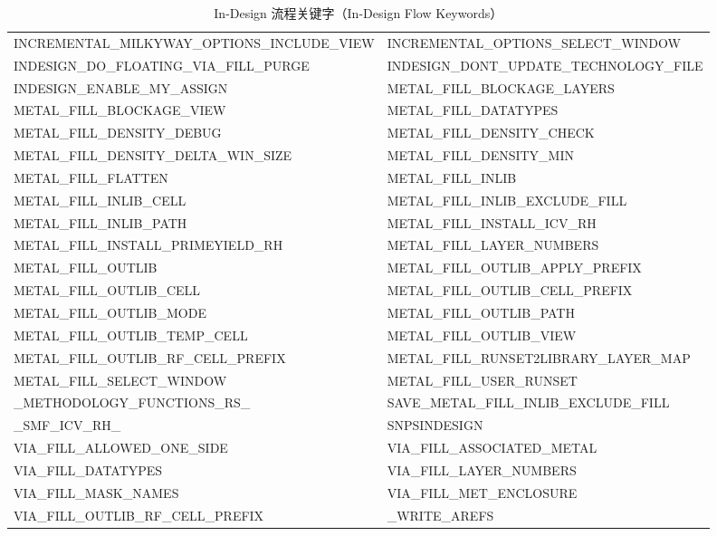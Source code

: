 \begin{longtable}{@{}>{\raggedright\arraybackslash\ttfamily}p{} >{\raggedright\arraybackslash\ttfamily}p{}@{}}
\caption{In-Design 流程关键字（In-Design Flow Keywords）}\label{tab:pxl-indesign-kw}\\
\toprule
\endfirsthead
\endhead
\bottomrule
\endfoot
INCREMENTAL\_MILKYWAY\_OPTIONS\_INCLUDE\_VIEW & INCREMENTAL\_OPTIONS\_SELECT\_WINDOW \\
INDESIGN\_DO\_FLOATING\_VIA\_FILL\_PURGE & INDESIGN\_DONT\_UPDATE\_TECHNOLOGY\_FILE \\
INDESIGN\_ENABLE\_MY\_ASSIGN & METAL\_FILL\_BLOCKAGE\_LAYERS \\
METAL\_FILL\_BLOCKAGE\_VIEW & METAL\_FILL\_DATATYPES \\
METAL\_FILL\_DENSITY\_DEBUG & METAL\_FILL\_DENSITY\_CHECK \\
METAL\_FILL\_DENSITY\_DELTA\_WIN\_SIZE & METAL\_FILL\_DENSITY\_MIN \\
METAL\_FILL\_FLATTEN & METAL\_FILL\_INLIB \\
METAL\_FILL\_INLIB\_CELL & METAL\_FILL\_INLIB\_EXCLUDE\_FILL \\
METAL\_FILL\_INLIB\_PATH & METAL\_FILL\_INSTALL\_ICV\_RH \\
METAL\_FILL\_INSTALL\_PRIMEYIELD\_RH & METAL\_FILL\_LAYER\_NUMBERS \\
METAL\_FILL\_OUTLIB & METAL\_FILL\_OUTLIB\_APPLY\_PREFIX \\
METAL\_FILL\_OUTLIB\_CELL & METAL\_FILL\_OUTLIB\_CELL\_PREFIX \\
METAL\_FILL\_OUTLIB\_MODE & METAL\_FILL\_OUTLIB\_PATH \\
METAL\_FILL\_OUTLIB\_TEMP\_CELL & METAL\_FILL\_OUTLIB\_VIEW \\
METAL\_FILL\_OUTLIB\_RF\_CELL\_PREFIX & METAL\_FILL\_RUNSET2LIBRARY\_LAYER\_MAP \\
METAL\_FILL\_SELECT\_WINDOW & METAL\_FILL\_USER\_RUNSET \\
\_METHODOLOGY\_FUNCTIONS\_RS\_ & SAVE\_METAL\_FILL\_INLIB\_EXCLUDE\_FILL \\
\_SMF\_ICV\_RH\_ & SNPSINDESIGN \\
VIA\_FILL\_ALLOWED\_ONE\_SIDE & VIA\_FILL\_ASSOCIATED\_METAL \\
VIA\_FILL\_DATATYPES & VIA\_FILL\_LAYER\_NUMBERS \\
VIA\_FILL\_MASK\_NAMES & VIA\_FILL\_MET\_ENCLOSURE \\
VIA\_FILL\_OUTLIB\_RF\_CELL\_PREFIX & \_WRITE\_AREFS \\
\end{longtable}

